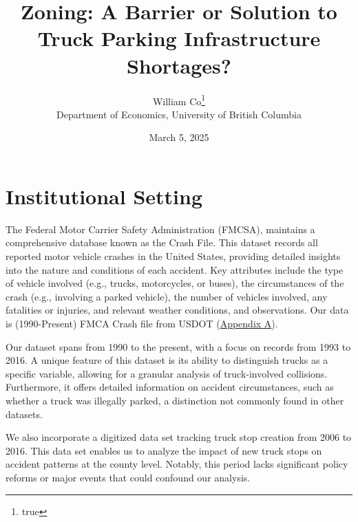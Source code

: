 \documentclass[
  8pt,
  12pt]{article}
\begin{document}
\def\spacingset#1{\renewcommand{\baselinestretch}%
{#1}\small\normalsize} \spacingset{1}



\date{March 5, 2025}
\title{\bf Zoning: A Barrier or Solution to Truck Parking Infrastructure
Shortages?}
\author{
William Co\thanks{true}\\
Department of Economics, University of British Columbia\\
}
\maketitle

\bigskip
\bigskip
\begin{abstract}

\end{abstract}


\newpage
\spacingset{1.9} %

\section{Institutional Setting}\label{institutional-setting}

The Federal Motor Carrier Safety Administration (FMCSA), maintains a
comprehensive database known as the Crash File. This dataset records all
reported motor vehicle crashes in the United States, providing detailed
insights into the nature and conditions of each accident. Key attributes
include the type of vehicle involved (e.g., trucks, motorcycles, or
buses), the circumstances of the crash (e.g., involving a parked
vehicle), the number of vehicles involved, any fatalities or injuries,
and relevant weather conditions, and observations. Our data is
(1990-Present) FMCA Crash file from USDOT
(\label{sec:appendix-a}\hyperref[sec-a.-visualization-of-dataset.-]{Appendix
A}).

Our dataset spans from 1990 to the present, with a focus on records from
1993 to 2016. A unique feature of this dataset is its ability to
distinguish trucks as a specific variable, allowing for a granular
analysis of truck-involved collisions. Furthermore, it offers detailed
information on accident circumstances, such as whether a truck was
illegally parked, a distinction not commonly found in other datasets.

We also incorporate a digitized data set tracking truck stop creation
from 2006 to 2016. This data set enables us to analyze the impact of new
truck stops on accident patterns at the county level. Notably, this
period lacks significant policy reforms or major events that could
confound our analysis.
\end{document}
